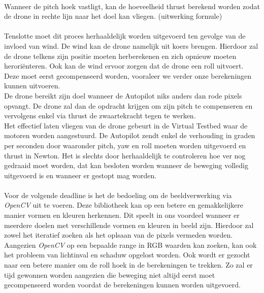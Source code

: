 \\
Wanneer de pitch hoek vastligt, kan de hoeveelheid thrust berekend worden zodat de drone in rechte lijn naar het doel kan vliegen. (uitwerking formule)
\\
\\
Tenslotte moet dit proces herhaaldelijk worden uitgevoerd ten gevolge van de invloed van wind. De wind kan de drone namelijk uit koers brengen. Hierdoor zal de drone telkens zijn positie moeten herberekenen en zich opnieuw moeten herori\"enteren. Ook kan de wind ervoor zorgen dat de drone een roll uitvoert. Deze moet eerst gecompenseerd worden, vooraleer we verder onze berekeningen kunnen uitvoeren.
\\
De drone bereikt zijn doel wanneer de Autopilot niks anders dan rode pixels opvangt. De drone zal dan de opdracht krijgen om zijn pitch te compenseren en vervolgens enkel via thrust de zwaartekracht tegen te werken.
\\
Het effectief laten vliegen van de drone gebeurt in de Virtual Testbed waar de motoren worden aangestuurd. De Autopilot zendt enkel de verhouding in graden per seconden door waaronder pitch, yaw en roll moeten worden uitgevoerd en thrust in Newton. Het is slechts door herhaaldelijk te controleren hoe ver nog gedraaid moet worden, dat kan besloten worden wanneer de beweging volledig uitgevoerd is en wanneer er gestopt mag worden.
\\
\\
Voor de volgende deadline is het de bedoeling om de beeldverwerking via \textit{OpenCV} uit te voeren. Deze bibliotheek kan op een betere en gemakkelijkere manier vormen en kleuren herkennen. Dit speelt in ons voordeel wanneer er meerdere doelen met verschillende vormen en kleuren in beeld zijn. Hierdoor zal zowel het iteratief zoeken als het oplsaan van de pixels vermeden worden. Aangezien \textit{OpenCV} op een bepaalde range in RGB waarden kan zoeken, kan ook het probleem van lichtinval en schaduw opgelost worden.
Ook wordt er gezocht naar een betere manier om de roll hoek in de berekeningen te trekken. Zo zal er tijd gewonnen worden aangezien die beweging niet altijd eerst moet gecompenseerd worden voordat de berekeningen kunnen worden uitgevoerd. 